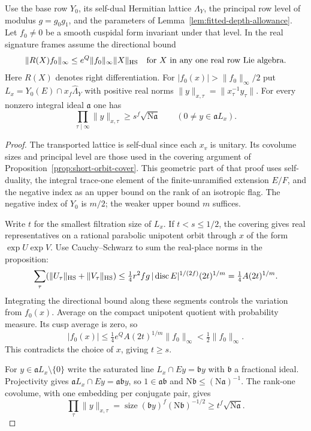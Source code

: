 \begin{auxlemma}\label{lem:fitted-large-row-lattice}
Use the base row \(Y_0\), its self-dual Hermitian lattice
\(\Lambda_Y\), the principal row level of modulus \(g=g_0g_1\), and
the parameters of Lemma~\ref{lem:fitted-depth-allowance}.
Let \(f_0\ne0\) be a smooth cuspidal form invariant under that level.
In the real signature frames assume the directional bound
\[
 \|R(X)f_0\|_\infty\le e^Q\|f_0\|_\infty\|X\|_{\rm HS}
 \quad\text{for }X\text{ in any one real row Lie algebra}.
\]
Here \(R(X)\) denotes right differentiation. For
\(|f_0(x)|>\|f_0\|_\infty/2\) put
\(L_x=Y_0(E)\cap x_f\widehat\Lambda_Y\) with positive real norms
\(\|y\|_{x,\tau}=\|x_\tau^{-1}y_\tau\|\). For every nonzero
integral ideal \(\mathfrak a\) one has
\[
 \prod_{\tau\mid\infty}\|y\|_{x,\tau}
       \ge s^f\sqrt{\mathrm N\mathfrak a}
       \qquad(0\ne y\in\mathfrak a L_x).
\]
\end{auxlemma}
\begin{proof}
The transported lattice is self-dual since each \(x_v\) is unitary.
Its covolume sizes and principal level are those used in the covering
argument of Proposition~\ref{prop:short-orbit-cover}. This geometric
part of that proof uses self-duality, the integral trace-one element
of the finite-unramified extension \(E/F\), and the negative index
as an upper bound on the rank of an isotropic flag. The negative
index of \(Y_0\) is \(m/2\); the weaker upper bound \(m\) suffices.

Write \(t\) for the smallest filtration size of \(L_x\). If
\(t<s\le1/2\), the covering gives real representatives on a rational
parabolic unipotent orbit through \(x\) of the form \(\exp U\exp V\).
Use Cauchy--Schwarz to sum the real-place norms in the proposition:
\[
 \sum_\tau(\|U_\tau\|_{\rm HS}+\|V_\tau\|_{\rm HS})
 \le \tfrac14 r^2 f g\,|\operatorname{disc}E|^{1/(2f)}(2t)^{1/m}
 =\tfrac14 A(2t)^{1/m} .
\]
Integrating the directional bound along these segments controls the
variation from \(f_0(x)\). Average on the compact unipotent quotient
with probability measure. Its cusp average is zero, so
\[
 |f_0(x)|\le \tfrac14e^Q A(2t)^{1/m}\|f_0\|_\infty
              <\tfrac12\|f_0\|_\infty .
\]
This contradicts the choice of \(x\), giving \(t\ge s\).

For \(y\in\mathfrak aL_x\setminus\{0\}\) write the saturated line
\(L_x\cap Ey=\mathfrak b y\) with \(\mathfrak b\) a fractional ideal.
Projectivity gives \(\mathfrak aL_x\cap Ey=\mathfrak a\mathfrak b y\),
so \(1\in\mathfrak a\mathfrak b\) and
\(\mathrm N\mathfrak b\le(\mathrm N\mathfrak a)^{-1}\).
The rank-one covolume, with one embedding per conjugate pair, gives
\[
 \prod_\tau\|y\|_{x,\tau}
 =\operatorname{size}(\mathfrak b y)^f(\mathrm N\mathfrak b)^{-1/2}
 \ge t^f\sqrt{\mathrm N\mathfrak a} .
\]
\end{proof}

